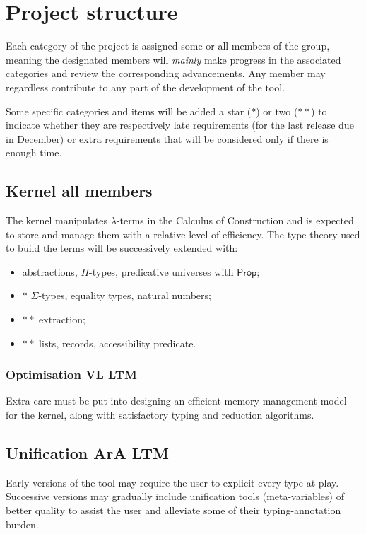 \documentclass[twocolumn]{article}
\begin{document}
\section{Project structure}
Each category of the project is assigned some or all members of the group,
meaning the designated members will \emph{mainly} make progress in the associated categories
and review the corresponding advancements. Any member may regardless contribute to any part
of the development of the tool.

Some specific categories and items will be added a star (\(*\)) or two (\(**\)) to
indicate whether they are respectively late requirements (for the last release
due in December)
or extra requirements that will be considered only if there is enough time.


\subsection{Kernel  \hfill\scriptsize all members}
The kernel manipulates \(\lambda\)-terms in the Calculus of Construction and is
expected to store and manage them with a relative level of efficiency.
The type theory used to build the terms will be successively extended with:
\begin{itemize}
  \item abstractions, \(\Pi\)-types, predicative universes with \(\mathsf{Prop}\);
  \item \(*\) \(\Sigma\)-types, equality types, natural numbers;
  \item \(**\) extraction;
  \item \(**\) lists, records, accessibility predicate.
\end{itemize}

\subsubsection{Optimisation \hfill\scriptsize VL LTM}
Extra care must be put into designing an efficient memory management model for
the kernel, along with satisfactory typing and reduction algorithms.


\subsection{Unification \hfill\scriptsize ArA LTM}
Early versions of the tool may require the user to explicit every type at play.
Successive versions may gradually include unification tools (meta-variables)
of better quality to assist the user and alleviate some of their typing-annotation
burden.
\end{document}
